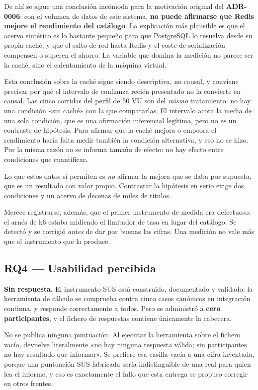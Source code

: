\documentclass[11pt,a4paper]{article}
\newcommand{\adr}[1]{\textbf{ADR-#1}}
\begin{document}
De ahí se sigue una conclusión incómoda para la motivación original del
\adr{0006}: con el volumen de datos de este sistema, \textbf{no puede afirmarse
que Redis mejore el rendimiento del catálogo}. La explicación más plausible es
que el acervo sintético es lo bastante pequeño para que PostgreSQL lo resuelva
desde su propia caché, y que el salto de red hasta Redis y el coste de
serialización compensen o superen el ahorro. La variable que domina la medición
no parece ser la caché, sino el calentamiento de la máquina virtual.

Esta conclusión sobre la caché sigue siendo descriptiva, no causal, y conviene
precisar por qué el intervalo de confianza recién presentado no la convierte en
causal. Las cinco corridas del perfil de 50 VU son del \emph{mismo}
tratamiento: no hay una condición «sin caché» con la que compararlas. El
intervalo acota la media de una sola condición, que es una afirmación
inferencial legítima, pero no es un contraste de hipótesis. Para afirmar que la
caché mejora o empeora el rendimiento haría falta medir también la condición
alternativa, y eso no se hizo. Por la misma razón no se informa tamaño de
efecto: no hay efecto entre condiciones que cuantificar.

Lo que estos datos sí permiten es \emph{no} afirmar la mejora que se daba por
supuesta, que es un resultado con valor propio. Contrastar la hipótesis en serio
exige dos condiciones y un acervo de decenas de miles de títulos.

Merece registrarse, además, que el primer instrumento de medida era defectuoso:
el arnés de k6 estaba midiendo el limitador de tasa en lugar del catálogo. Se
detectó y se corrigió \emph{antes} de dar por buenas las cifras. Una medición no
vale más que el instrumento que la produce.

\subsection{RQ4 --- Usabilidad percibida}

\textbf{Sin respuesta.} El instrumento SUS está construido, documentado y
validado: la herramienta de cálculo se comprueba contra cinco casos canónicos en
integración continua, y responde correctamente a todos. Pero se administró a
\textbf{cero participantes}, y el fichero de respuestas contiene únicamente la
cabecera.

No se publica ninguna puntuación. Al ejecutar la herramienta sobre el fichero
vacío, devuelve literalmente «no hay ninguna respuesta válida; sin participantes
no hay resultado que informar». Se prefiere esa casilla vacía a una cifra
inventada, porque una puntuación SUS fabricada sería indistinguible de una real
para quien lea el informe, y eso es exactamente el fallo que esta entrega se
propuso corregir en otros frentes.
\end{document}
